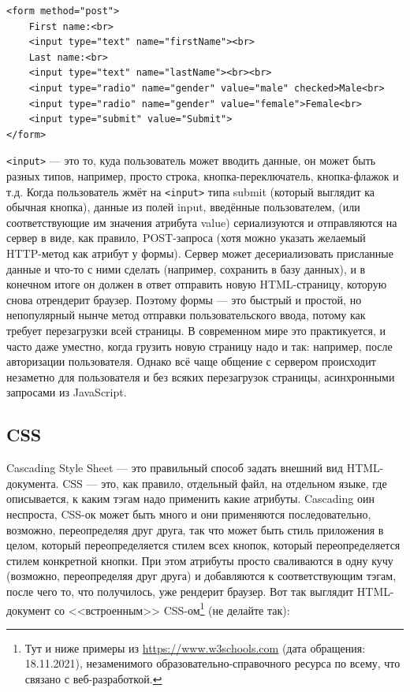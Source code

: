 \documentclass[a5paper]{article}
\begin{document}
\begin{verbatim}
<form method="post">
    First name:<br>
    <input type="text" name="firstName"><br>
    Last name:<br>
    <input type="text" name="lastName"><br><br>
    <input type="radio" name="gender" value="male" checked>Male<br>
    <input type="radio" name="gender" value="female">Female<br>
    <input type="submit" value="Submit">
</form>
\end{verbatim}

\texttt{<input>} --- это то, куда пользователь может вводить данные, он может быть разных типов, например, просто строка, кнопка-переключатель, кнопка-флажок и т.д. Когда пользователь жмёт на \texttt{<input>} типа submit (который выглядит ка обычная кнопка), данные из полей input, введённые пользователем, (или соответствующие им значения атрибута value) сериализуются и отправляются на сервер в виде, как правило, POST-запроса (хотя можно указать желаемый HTTP-метод как атрибут у формы). Сервер может десериализовать присланные данные и что-то с ними сделать (например, сохранить в базу данных), и в конечном итоге он должен в ответ отправить новую HTML-страницу, которую снова отрендерит браузер. Поэтому формы --- это быстрый и простой, но непопулярный нынче метод отправки пользовательского ввода, потому как требует перезагрузки всей страницы. В современном мире это практикуется, и часто даже уместно, когда грузить новую страницу надо и так: например, после авторизации пользователя. Однако всё чаще общение с сервером происходит незаметно для пользователя и без всяких перезагрузок страницы, асинхронными запросами из JavaScript.

\subsection{CSS}

Cascading Style Sheet --- это правильный способ задать внешний вид HTML-документа. CSS --- это, как правило, отдельный файл, на отдельном языке, где описывается, к каким тэгам надо применить какие атрибуты. Cascading оин неспроста, CSS-ок может быть много и они применяются последовательно, возможно, переопределяя друг друга, так что может быть стиль приложения в целом, который переопределяется стилем всех кнопок, который переопределяется стилем конкретной кнопки. При этом атрибуты просто сваливаются в одну кучу (возможно, переопределяя друг друга) и добавляются к соответствующим тэгам, после чего то, что получилось, уже рендерит браузер. Вот так выглядит HTML-документ со <<встроенным>> CSS-ом\footnote{Тут и ниже примеры из \url{https://www.w3schools.com} (дата обращения: 18.11.2021), незаменимого образовательно-справочного ресурса по всему, что связано с веб-разработкой.} (не делайте так):
\end{document}
